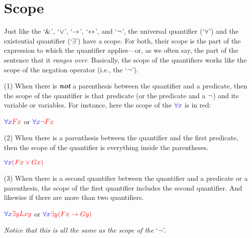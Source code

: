 \section{Scope}

Just like the `$\mathbin{\&}$', `$\vee$', `$\rightarrow$', `$\leftrightarrow$', and `${\neg}$', the universal quantifier (`$\forall$’) and the existential quantifier (`$\exists$’) have a scope. For both, their scope is the part of the expression to which the quantifier applies---or, as we often say, the part of the sentence that it \textit{ranges over}. Basically, the scope of the quantifiers works like the scope of the negation operator (i.e., the `${\neg}$’). 

\begin{ebullet}
\item[(1)] When there is \textit\textbf{not} a parenthesis between the quantifier and a predicate, then the scope of the quantifier is that predicate (or the predicate and a ${\neg}$) and its variable or variables. For instance, here the scope of the $\color{blue}{\forall x}$ is in red:
\begin{earg}
\item[] $\color{blue}{\forall x} \color{red}{Fx}$ or $\color{blue}{\forall x} \color{red}{\ensuremath{{\neg}}Fx}$ 
\end{earg}
\smallskip

\item[(2)] When there is a parenthesis between the quantifier and the first predicate, then the scope of the quantifier is everything inside the parentheses.
\begin{earg}
\item[] $\color{blue}{\forall x} \color{red}{(Fx \ensuremath{\vee}Gx)}$ 
\end{earg}
\smallskip

\item[(3)] When there is a second quantifier between the quantifier and a predicate or a parenthesis, the scope of the first quantifier includes the second quantifier. And likewise if there are more than two quantifiers.
\begin{earg}
\item[] $\color{blue}{\forall x} \color{red}{\exists yLxy}$ or $\color{blue}{\forall x} \color{red}{\exists y(Fx \ensuremath{\rightarrow}Gy)}$
\end{earg}
\smallskip
\item[] \textit{Notice that this is all the same as the scope of the} `${\neg}$’.
\end{ebullet}
